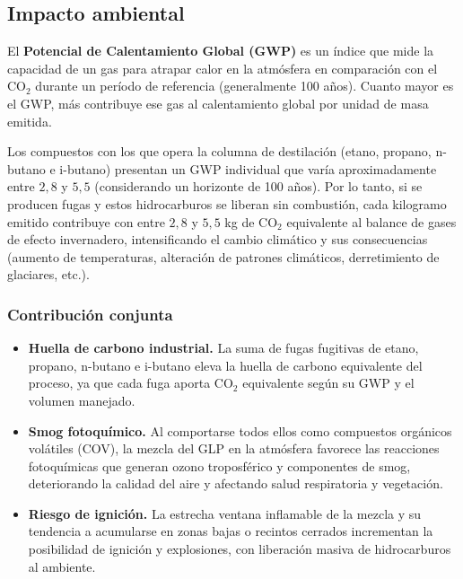 \subsection{Impacto ambiental}

El \textbf{Potencial de Calentamiento Global (GWP)} es un índice que mide la capacidad de un gas para atrapar calor en la atmósfera en comparación con el CO$_2$ durante un período de referencia (generalmente 100 años). Cuanto mayor es el GWP, más contribuye ese gas al calentamiento global por unidad de masa emitida.

Los compuestos con los que opera la columna de destilación (etano, propano, n-butano e i-butano) presentan un GWP individual que varía aproximadamente entre $2{,}8$ y $5{,}5$ (considerando un horizonte de 100 años). Por lo tanto, si se producen fugas y estos hidrocarburos se liberan sin combustión, cada kilogramo emitido contribuye con entre $2{,}8$ y $5{,}5$ kg de CO$_2$ equivalente al balance de gases de efecto invernadero, intensificando el cambio climático y sus consecuencias (aumento de temperaturas, alteración de patrones climáticos, derretimiento de glaciares, etc.).

\subsubsection*{Contribución conjunta}

\begin{itemize}
    \item \textbf{Huella de carbono industrial.} La suma de fugas fugitivas de etano, propano, n-butano e i-butano eleva la huella de carbono equivalente del proceso, ya que cada fuga aporta CO$_2$ equivalente según su GWP y el volumen manejado.
    \item \textbf{Smog fotoquímico.} Al comportarse todos ellos como compuestos orgánicos volátiles (COV), la mezcla del GLP en la atmósfera favorece las reacciones fotoquímicas que generan ozono troposférico y componentes de smog, deteriorando la calidad del aire y afectando salud respiratoria y vegetación.
    \item \textbf{Riesgo de ignición.} La estrecha ventana inflamable de la mezcla y su tendencia a acumularse en zonas bajas o recintos cerrados incrementan la posibilidad de ignición y explosiones, con liberación masiva de hidrocarburos al ambiente.
\end{itemize}